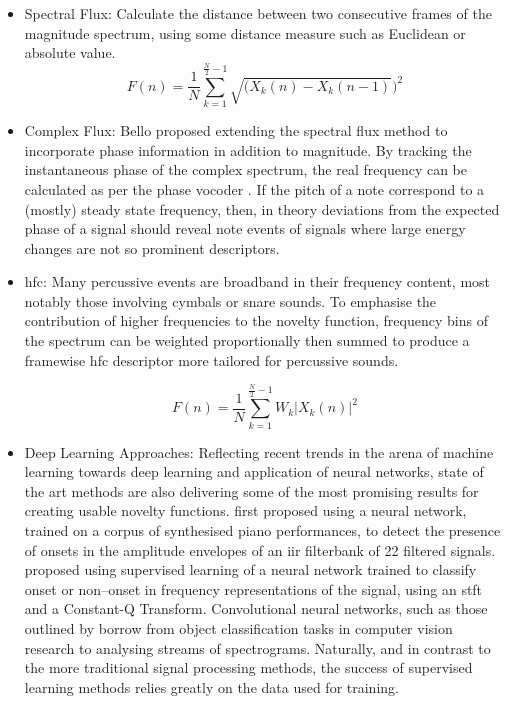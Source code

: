 \begin{itemize}
\item Spectral Flux: Calculate the distance between two consecutive frames of the magnitude spectrum, using some distance measure such as Euclidean or absolute value.
\begin{equation}
\label{eq:Spectral Flux}	
F(n)=\frac{1}{N}\sum_{k=1}^{\frac{N}{2}-1}\sqrt{(X_{k}(n)-X_{k}(n-1)})^{2}
\end{equation}
\item Complex Flux: Bello proposed extending the spectral flux method to incorporate phase information in addition to magnitude. By tracking the instantaneous phase of the complex spectrum, the real frequency can be calculated as per the phase vocoder \citep{Roads1996}. If the pitch of a note correspond to a (mostly) steady state frequency, then, in theory deviations from the expected phase of a signal should reveal note events of signals where large energy changes are not so prominent descriptors.
\item \acrfull{hfc}: Many percussive events are broadband in their frequency content, most notably those involving cymbals or snare sounds. To emphasise the contribution of higher frequencies to the novelty function, frequency bins of the spectrum can be weighted proportionally then summed to produce a framewise \acrshort{hfc} descriptor more tailored for percussive sounds.

\begin{equation}
\label{eq:High Frequency Content}	
F(n)=\frac{1}{N}\sum_{k=1}^{\frac{N}{2}-1}W_{k}|X_{k}(n)|^{2}
\end{equation}

\item Deep Learning Approaches: Reflecting recent trends in the arena of machine learning towards deep learning and application of neural networks, state of the art methods are also delivering some of the most promising results for creating usable novelty functions. \cite{Marolt2002} first proposed using a neural network, trained on a corpus of synthesised piano performances, to detect the presence of onsets in the amplitude envelopes of an \acrshort{iir} filterbank of 22 filtered signals.  \cite{Lacoste2007} proposed using supervised learning of a neural network trained to classify onset or non–onset in frequency representations of the signal, using an \acrshort{stft} and a Constant-Q Transform. Convolutional neural networks, such as those outlined by \cite{Schluter2013, Schluter2014} borrow from object classification tasks in computer vision research  to analysing streams of spectrograms. Naturally, and in contrast to the more traditional signal processing methods, the success of supervised learning methods relies greatly on the data used for training.
\end{itemize}


